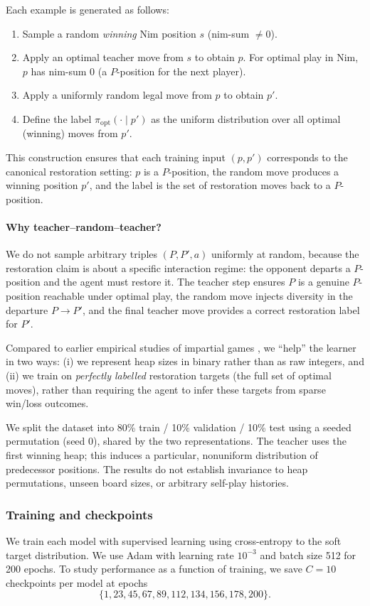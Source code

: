 \documentclass[twoside,11pt]{article}
\numberwithin{theorem}{section}
\numberwithin{equation}{section}
\begin{document}
Each example is generated as follows:
\begin{enumerate}
  \item Sample a random \emph{winning} Nim position $s$ (nim-sum $\ne 0$).
  \item Apply an optimal teacher move from $s$ to obtain $p$.
        For optimal play in Nim, $p$ has nim-sum $0$ (a $P$-position for the next player).
  \item Apply a uniformly random legal move from $p$ to obtain $p'$.
  \item Define the label $\pi_{\mathrm{opt}}(\cdot \mid p')$ as the uniform distribution over all optimal (winning) moves from $p'$.
\end{enumerate}
This construction ensures that each training input $(p,p')$ corresponds to the canonical restoration setting:
$p$ is a $P$-position, the random move produces a winning position $p'$, and the label is the set of restoration moves back to a $P$-position.

\paragraph{Why teacher--random--teacher?}
We do not sample arbitrary triples $(P,P',a)$ uniformly at random, because the restoration claim is about a specific interaction regime: the opponent departs a $P$-position and the agent must restore it. The teacher step ensures $P$ is a genuine $P$-position reachable under optimal play, the random move injects diversity in the departure $P\to P'$, and the final teacher move provides a correct restoration label for $P'$.

Compared to earlier empirical studies of impartial games \citep{zhou2022impartial,zhou2023parity}, we ``help'' the learner in two ways:
(i) we represent heap sizes in binary rather than as raw integers, and
(ii) we train on \emph{perfectly labelled} restoration targets (the full set of optimal moves), rather than requiring the agent to infer these targets from sparse win/loss outcomes.

We split the dataset into 80\% train / 10\% validation / 10\% test using a seeded permutation (seed 0), shared by the two representations. The teacher uses the first winning heap; this induces a particular, nonuniform distribution of predecessor positions. The results do not establish invariance to heap permutations, unseen board sizes, or arbitrary self-play histories.

\subsubsection{Training and checkpoints}
We train each model with supervised learning using cross-entropy to the soft target distribution.
We use Adam with learning rate $10^{-3}$ and batch size 512 for 200 epochs.
To study performance as a function of training, we save $C=10$ checkpoints per model at epochs
\[\{1,23,45,67,89,112,134,156,178,200\}.\]
\end{document}
